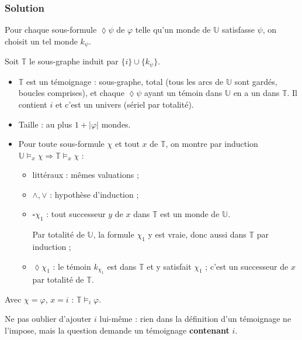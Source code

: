 \documentclass[11pt,a4paper]{article}
\providecommand{\tightlist}{\setlength{\itemsep}{0pt}\setlength{\parskip}{0pt}}
\providecommand{\Box}{\square}
\providecommand{\Diamond}{\lozenge}
\begin{document}
\hypertarget{solution-37}{%
\subsubsection{Solution}\label{solution-37}}

Pour chaque sous-formule \(\Diamond\psi\) de \(\varphi\) telle qu'un monde de \(\mathbb U\) satisfasse \(\psi\), on choisit un tel monde \(k_\psi\).

Soit \(\mathbb T\) le sous-graphe induit par \(\{i\}\cup\{k_\psi\}\).

\begin{itemize}
\tightlist
\item
  \(\mathbb T\) est un témoignage : sous-graphe, total (tous les arcs de \(\mathbb U\) sont gardés, boucles comprises), et chaque \(\Diamond\psi\) ayant un témoin dans \(\mathbb U\) en a un dans \(\mathbb T\). Il contient \(i\) et c'est un univers (sériel par totalité).
\item
  Taille : au plus \(1+|\varphi|\) mondes.
\item
  Pour toute sous-formule \(\chi\) et tout \(x\) de \(\mathbb T\), on montre par induction \(\mathbb U\models_x\chi\Rightarrow\mathbb T\models_x\chi\) :

  \begin{itemize}
  \item
    littéraux : mêmes valuations ;
  \item
    \(\wedge,\vee\) : hypothèse d'induction ;
  \item
    \(\Box\chi_1\) : tout successeur \(y\) de \(x\) dans \(\mathbb T\) est un monde de \(\mathbb U\).

    Par totalité de \(\mathbb U\), la formule \(\chi_1\) y est vraie, donc aussi dans \(\mathbb T\) par induction ;
  \item
    \(\Diamond\chi_1\) : le témoin \(k_{\chi_1}\) est dans \(\mathbb T\) et y satisfait \(\chi_1\) ; c'est un successeur de \(x\) par totalité de \(\mathbb T\).
  \end{itemize}
\end{itemize}

Avec \(\chi=\varphi\), \(x=i\) : \(\mathbb T\models_i\varphi\).

\begin{piege}

Ne pas oublier d'ajouter \(i\) lui-même : rien dans la définition d'un témoignage ne l'impose, mais la question demande un témoignage \textbf{contenant} \(i\).

\end{piege}
\end{document}
